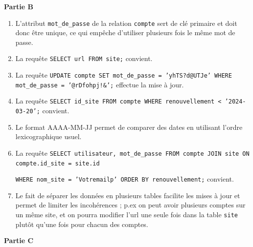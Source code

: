 \documentclass[11pt,a4paper]{article}
\begin{document}
\textbf{Partie B}


\begin{enumerate}[resume]
\item L'attribut \texttt{mot\_de\_passe} de la relation \texttt{compte} sert de clé primaire et doit donc être unique, ce qui empêche d'utiliser plusieurs fois le même mot de passe.
\item La requête \texttt{SELECT url FROM site;} convient.
\item La requête \texttt{UPDATE compte SET mot\_de\_passe = 'yhTS?d@UTJe' WHERE mot\_de\_passe = '@rDfohpj!\&';} effectue la mise à jour.

\item La requête \texttt{SELECT id\_site FROM compte WHERE renouvellement < '2024-03-20';} convient.
\item Le format AAAA-MM-JJ permet de comparer des dates en utilisant l'ordre lexicographique usuel. 
\item La requête \texttt{SELECT utilisateur, mot\_de\_passe FROM compte JOIN site ON compte.id\_site = site.id }
 
\texttt{WHERE nom\_site = 'Votremailp' ORDER BY renouvellement;} convient.
\item Le fait de séparer les données en plusieurs tables facilite les mises à jour et permet
de limiter les incohérences ; p.ex on peut avoir plusieurs comptes sur un même site, et on pourra modifier l'url une seule fois dans la table \texttt{site} plutôt qu'une fois pour chacun des comptes.
\end{enumerate}

\bigskip

\textbf{Partie C}
\end{document}
